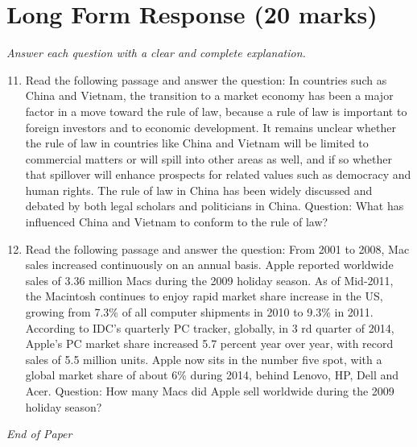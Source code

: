 \documentclass[12pt]{article}
\begin{document}
\section*{Long Form Response (20 marks)}
\textit{Answer each question with a clear and complete explanation.}
\begin{enumerate}[label=\arabic*.]
\setcounter{enumi}{10}
\item Read the following passage and answer the question: In countries such as China and Vietnam, the transition to a market economy has been a major factor in a move toward the rule of law, because a rule of law is important to foreign investors and to economic development. It remains unclear whether the rule of law in countries like China and Vietnam will be limited to commercial matters or will spill into other areas as well, and if so whether that spillover will enhance prospects for related values such as democracy and human rights. The rule of law in China has been widely discussed and debated by both legal scholars and politicians in China. Question: What has influenced China and Vietnam to conform to the rule of law?
\item Read the following passage and answer the question: From 2001 to 2008, Mac sales increased continuously on an annual basis. Apple reported worldwide sales of 3.36 million Macs during the 2009 holiday season. As of Mid-2011, the Macintosh continues to enjoy rapid market share increase in the US, growing from 7.3\% of all computer shipments in 2010 to 9.3\% in 2011. According to IDC's quarterly PC tracker, globally, in 3 rd quarter of 2014, Apple's PC market share increased 5.7 percent year over year, with record sales of 5.5 million units. Apple now sits in the number five spot, with a global market share of about 6\% during 2014, behind Lenovo, HP, Dell and Acer. Question: How many Macs did Apple sell worldwide during the 2009 holiday season?
\end{enumerate}

\vfill
\noindent\textit{End of Paper}
\end{document}
